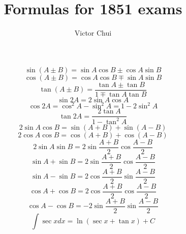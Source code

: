 \documentclass{article}
\title{Formulas for 1851 exams}
\author{Victor Chui}
\begin{document}
\maketitle
\begin{equation}
	\sin(A\pm B) = \sin A\cos B\pm \cos A\sin B	
\end{equation}
\begin{equation}
	\cos(A\pm B) = \cos A\cos B\mp \sin A\sin B
\end{equation}
\begin{equation}
	\tan(A\pm B) = \frac{\tan A\pm \tan B}{1\mp \tan A\tan B}
\end{equation}
\begin{equation}
	\sin 2A = 2\sin A\cos A
\end{equation}
\begin{equation}
	\cos 2A = \cos^{2}A - \sin^{2}A = 1-2\sin^{2}A
\end{equation}
\begin{equation}
	\tan 2A = \frac{2\tan A}{1-\tan^{2}A}
\end{equation}
\begin{equation}
	2\sin A\cos B = \sin(A+B)+\sin(A-B)
\end{equation}
\begin{equation}
	2\cos A\cos B = \cos (A+B)+\cos (A-B)
\end{equation}
\begin{equation}
	2\sin A\sin B = 2\sin \frac{A+B}{2} \cos \frac{A-B}{2}
\end{equation}
\begin{equation}
	\sin A + \sin B = 2\sin \frac{A+B}{2} \cos \frac{A-B}{2}
\end{equation}
\begin{equation}
	\sin A - \sin B = 2\cos \frac{A+B}{2} \sin \frac{A-B}{2}
\end{equation}
\begin{equation}
	\cos A + \cos B = 2\cos \frac{A+B}{2} \cos \frac{A-B}{2}
\end{equation}
\begin{equation}
	\cos A - \cos B = -2\sin \frac{A+B}{2} \sin \frac{A-B}{2}
\end{equation}
\begin{equation}
	\int \sec xdx = \ln(\sec x + \tan x) + C
\end{equation}
\end{document}
